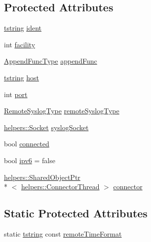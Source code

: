 \subsection*{Protected Attributes}
\begin{DoxyCompactItemize}
\item 
\hyperlink{namespacelog4cplus_a3c9287f6ebcddc50355e29d71152117b}{tstring} \hyperlink{classlog4cplus_1_1SysLogAppender_a1c134d3951669090128e20342e88acba}{ident}
\item 
int \hyperlink{classlog4cplus_1_1SysLogAppender_a2fcd41cf54cfd3c3026a2ed684df3db3}{facility}
\item 
\hyperlink{classlog4cplus_1_1SysLogAppender_a60a3cdf1a9574897b146a9349f0016ab}{Append\-Func\-Type} \hyperlink{classlog4cplus_1_1SysLogAppender_a09eefcd6b9025416163fb7588a0ae12f}{append\-Func}
\item 
\hyperlink{namespacelog4cplus_a3c9287f6ebcddc50355e29d71152117b}{tstring} \hyperlink{classlog4cplus_1_1SysLogAppender_aac29818cf18aaaaf24158c728500399d}{host}
\item 
int \hyperlink{classlog4cplus_1_1SysLogAppender_a4ead2abb8439ca8a1c68028d2006eb5d}{port}
\item 
\hyperlink{classlog4cplus_1_1SysLogAppender_a1c7b4852672b2e8fe3c00c215c34d407}{Remote\-Syslog\-Type} \hyperlink{classlog4cplus_1_1SysLogAppender_ace612a729b15603c3d8463ab566a2a2d}{remote\-Syslog\-Type}
\item 
\hyperlink{classlog4cplus_1_1helpers_1_1Socket}{helpers\-::\-Socket} \hyperlink{classlog4cplus_1_1SysLogAppender_abce290f111de47a6b43d025d261861e3}{syslog\-Socket}
\item 
bool \hyperlink{classlog4cplus_1_1SysLogAppender_a2d27430b27c79fa3744d5b549c7c1c83}{connected}
\item 
bool \hyperlink{classlog4cplus_1_1SysLogAppender_aceb0543b47c4ccbd09511fd87b24abaf}{ipv6} = false
\item 
\hyperlink{classlog4cplus_1_1helpers_1_1SharedObjectPtr}{helpers\-::\-Shared\-Object\-Ptr}\\*
$<$ \hyperlink{classlog4cplus_1_1helpers_1_1ConnectorThread}{helpers\-::\-Connector\-Thread} $>$ \hyperlink{classlog4cplus_1_1SysLogAppender_afb0fa118a282160d7add4fd4c296130f}{connector}
\end{DoxyCompactItemize}
\subsection*{Static Protected Attributes}
\begin{DoxyCompactItemize}
\item 
static \hyperlink{namespacelog4cplus_a3c9287f6ebcddc50355e29d71152117b}{tstring} const \hyperlink{classlog4cplus_1_1SysLogAppender_aa3d5e80cdecbb89a188759013d996d9b}{remote\-Time\-Format}
\end{DoxyCompactItemize}
